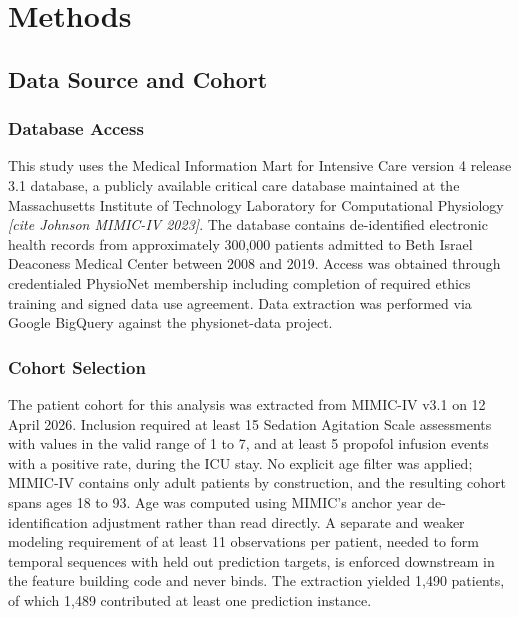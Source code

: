 \documentclass[11pt,a4paper]{article}
\newcommand{\placeholder}[1]{\textcolor{placeholdergray}{\textit{[#1]}}}
\begin{document}
\section{Methods}

\subsection{Data Source and Cohort}

\subsubsection{Database Access}

This study uses the Medical Information Mart for Intensive Care version
4 release 3.1 database, a publicly available critical care database
maintained at the Massachusetts Institute of Technology Laboratory for
Computational Physiology \placeholder{cite Johnson MIMIC-IV 2023}. The
database contains de-identified electronic health records from
approximately 300,000 patients admitted to Beth Israel Deaconess Medical
Center between 2008 and 2019. Access was obtained through credentialed
PhysioNet membership including completion of required ethics training
and signed data use agreement. Data extraction was performed via Google
BigQuery against the physionet-data project.

\subsubsection{Cohort Selection}

The patient cohort for this analysis was extracted from MIMIC-IV v3.1
on 12 April 2026. Inclusion required at least 15 Sedation Agitation
Scale assessments with values in the valid range of 1 to 7, and at
least 5 propofol infusion events with a positive rate, during the ICU
stay. No explicit age filter was applied; MIMIC-IV contains only adult
patients by construction, and the resulting cohort spans ages 18 to 93.
Age was computed using MIMIC's anchor year de-identification
adjustment rather than read directly. A separate and weaker modeling
requirement of at least 11 observations per patient, needed to form
temporal sequences with held out prediction targets, is enforced
downstream in the feature building code and never binds. The
extraction yielded 1,490 patients, of which 1,489 contributed at least
one prediction instance.
\end{document}
